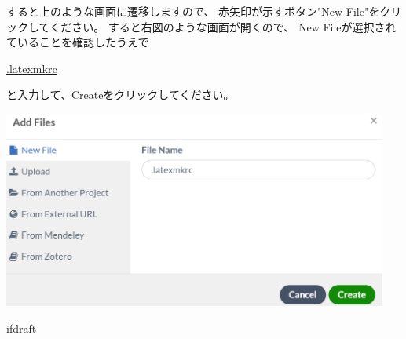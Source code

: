		\noindent
		\begin{minipage}{0.4\hsize}%
			すると上のような画面に遷移しますので、
			赤矢印が示すボタン"New File"をクリックしてください。
			すると右図のような画面が開くので、
			New Fileが選択されていることを確認したうえで
			\begin{mdframed}[style=shadow]
				\url{.latexmkrc}
			\end{mdframed}\vspace{-3mm}
			と入力して、Createをクリックしてください。
		\end{minipage}\hfill
		\begin{minipage}{0.6\hsize}
			\begin{flushright}
				\includegraphics[width=0.95\textwidth]{figure/overleaf-editer-newfile.png}		
			\end{flushright}
		\end{minipage}

		


\expandafter\ifx\csname ifdraft\endcsname\relax
	
\fi